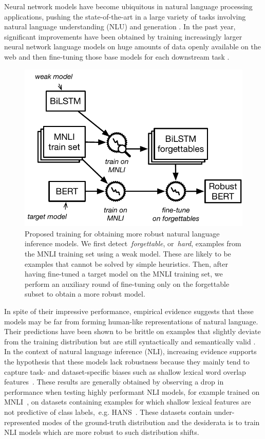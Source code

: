
Neural network models have become ubiquitous in natural language processing applications, pushing the state-of-the-art in a large variety of tasks involving natural language understanding (NLU) and generation \cite{wu2016google,wang2019superglue}.
In the past year, significant improvements have been obtained by  training increasingly larger neural network language models on huge amounts of data openly available on the web and then fine-tuning those base models for each downstream task \cite{devlin2018bert,peters2018deep,liu2019multi}.

\begin{figure}[tbp]
\centering
\includegraphics[scale=0.55]{figures/acl.pdf}
\caption{Proposed training for obtaining more robust natural language inference models. We first detect~\emph{forgettable}, or~\emph{hard}, examples from the MNLI training set using a weak model. These are likely to be examples that cannot be solved by simple heuristics. Then, after having fine-tuned a target model on the MNLI training set, we perform an auxiliary round of fine-tuning only on the forgettable subset to obtain a more robust model.}
\label{}
\end{figure}

In spite of their impressive performance, empirical evidence suggests that these models may be far from forming human-like representations of natural language. Their predictions have been shown to be brittle on examples that slightly deviate from the training distribution but are still syntactically and semantically valid \cite{jia2017adversarial,linzen2019right}.
In the context of natural language inference (NLI), increasing evidence supports the hypothesis that these models lack robustness because they mainly tend to capture task- and dataset-specific biases such as shallow lexical word overlap features~\cite{poliak2018hypothesis,dasgupta2018evaluating,linzen2019right,clark2019dont,zhang-etal-2019-paws}. These results are generally obtained by observing a drop in performance when testing highly performant NLI models, for example trained on MNLI~\citep{williams2017broad}, on datasets containing examples for which shallow lexical features are not predictive of class labels,~e.g. HANS~\citep{linzen2019right}. These datasets contain under-represented modes of the ground-truth distribution and the desiderata is to train NLI models which are more robust to such distribution shifts.

